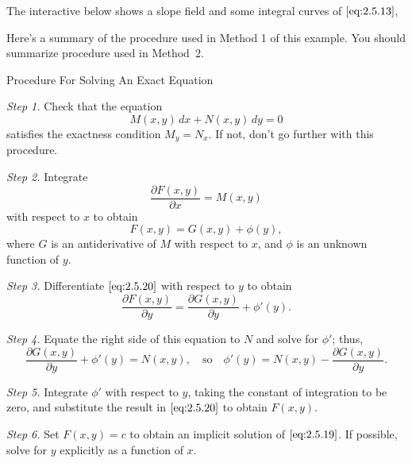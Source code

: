 \documentclass{ximera}
\begin{document}
\begin{example}
\begin{explanation}
The interactive below shows a slope field and  some
integral curves of $\eqref{eq:2.5.13}$,

\begin{center}
\end{center}

\end{explanation}
\end{example}
 
 
Here's a summary of the procedure used in Method 1 of this
example. You should summarize procedure used in Method~2.
 
 
Procedure For Solving An Exact
Equation
 
 
\begin{procedure}\label{proc:solvingExactEq}
 
\textit{Step 1.} Check that the equation
\begin{equation} \label{eq:2.5.19}
 M(x,y)\,dx+N(x,y)\,dy=0
\end{equation}
satisfies the exactness condition  $M_y=N_x$. If not,
don't go further with this procedure.
 
\textit{Step 2.} Integrate
$$
\frac{\partial F(x,y)}{\partial x}=M(x,y)
$$
with respect to $x$ to obtain
\begin{equation} \label{eq:2.5.20}
F(x,y)=G(x,y)+\phi(y),
\end{equation}
where $G$ is an antiderivative of $M$ with respect to $x$, and $\phi$
is an unknown function of $y$.
 
\textit{Step 3.} Differentiate $\eqref{eq:2.5.20}$ with respect to
$y$  to obtain
$$
\frac{\partial F(x,y)}{\partial y}=\frac{\partial G(x,y)}{\partial
y}+\phi'(y).
$$
 
\textit{Step 4.} Equate the right side of this equation to $N$ and solve
for $\phi'$;    thus,
$$
 \frac{\partial G(x,y)}{\partial y}+\phi'(y)=N(x,y),\quad\text{so}\quad
\phi'(y)=N(x,y)-\frac{\partial G(x,y)}{\partial y}.
$$
 
\textit{Step 5.} Integrate $\phi'$ with respect to $y$, taking the
constant of integration to be zero, and substitute the result in
$\eqref{eq:2.5.20}$ to obtain $F(x,y)$.
 
\textit{Step 6.} Set $F(x,y)=c$ to obtain an implicit solution of
$\eqref{eq:2.5.19}$. If possible, solve for $y$ explicitly as a
function of $x$.
 
\end{procedure}
 
\end{document}
